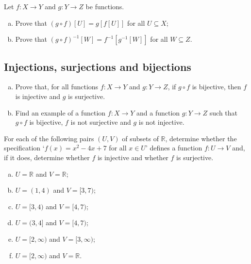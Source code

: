\begin{chapex}
Let $f : X \to Y$ and $g : Y \to Z$ be functions.
\begin{enumerate}[(a)]
\item Prove that $(g \circ f)[U] = g[f[U]]$ for all $U \subseteq X$;
\item Prove that $(g \circ f)^{-1}[W] = f^{-1}[g^{-1}[W]]$ for all $W \subseteq Z$.
\end{enumerate}
\end{chapex}

\subsection*{Injections, surjections and bijections}

\begin{chapex}
\fixlistskip%
\begin{enumerate}[(a)]
\item Prove that, for all functions $f : X \to Y$ and $g : Y \to Z$, if $g \circ f$ is bijective, then $f$ is injective and $g$ is surjective.
\item Find an example of a function $f : X \to Y$ and a function $g : Y \to Z$ such that $g \circ f$ is bijective, $f$ is not surjective and $g$ is not injective.
\end{enumerate}
\end{chapex}

\begin{chapex}
\label{cqInjectionSurjectionBijection}
For each of the following pairs $(U,V)$ of subsets of $\mathbb{R}$, determine whether the specification `$f(x) = x^2-4x+7$ for all $x \in U$' defines a function $f : U \to V$ and, if it does, determine whether $f$ is injective and whether $f$ is surjective.
\begin{multicols}{2}
\begin{enumerate}[(a)]
\item $U = \mathbb{R}$ and $V = \mathbb{R}$;
\item $U = (1, 4)$ and $V = [3, 7)$;
\item $U = [3, 4)$ and $V = [4, 7)$;
\item $U = (3, 4]$ and $V = [4, 7)$;
\item $U = [2, \infty)$ and $V = [3, \infty)$;
\item $U = [2,\infty)$ and $V = \mathbb{R}$.
\end{enumerate}
\end{multicols}
\end{chapex}

